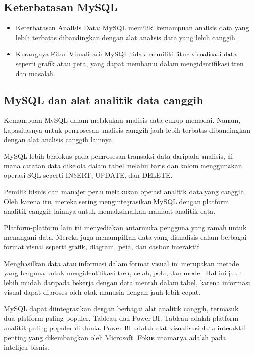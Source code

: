 \documentclass{article}
\begin{document}
\subsection{Keterbatasan MySQL}
\begin{itemize}
    \item Keterbatasan Analisis Data: MySQL memiliki kemampuan analisis data yang lebih terbatas dibandingkan dengan alat analisis data yang lebih canggih.
    \item Kurangnya Fitur Visualisasi: MySQL tidak memiliki fitur visualisasi data seperti grafik atau peta, yang dapat membantu dalam mengidentifikasi tren dan masalah.
\end{itemize}

\subsection{MySQL dan alat analitik data canggih}
Kemampuan MySQL dalam melakukan analisis data cukup memadai. Namun, kapasitasnya untuk pemrosesan analisis canggih jauh lebih terbatas dibandingkan dengan alat analisis canggih lainnya.

MySQL lebih berfokus pada pemrosesan transaksi data daripada analisis, di mana catatan data dikelola dalam tabel melalui baris dan kolom menggunakan operasi SQL seperti INSERT, UPDATE, dan DELETE.

Pemilik bisnis dan manajer perlu melakukan operasi analitik data yang canggih. Oleh karena itu, mereka sering mengintegrasikan MySQL dengan platform analitik canggih lainnya untuk memaksimalkan manfaat analitik data.

Platform-platform lain ini menyediakan antarmuka pengguna yang ramah untuk menangani data. Mereka juga menampilkan data yang dianalisis dalam berbagai format visual seperti grafik, diagram, peta, dan dasbor interaktif.

Menghasilkan data atau informasi dalam format visual ini merupakan metode yang berguna untuk mengidentifikasi tren, celah, pola, dan model. Hal ini jauh lebih mudah daripada bekerja dengan data mentah dalam tabel, karena informasi visual dapat diproses oleh otak manusia dengan jauh lebih cepat.

MySQL dapat diintegrasikan dengan berbagai alat analitik canggih, termasuk dua platform paling populer, Tableau dan Power BI. Tableau adalah platform analitik paling populer di dunia. Power BI adalah alat visualisasi data interaktif penting yang dikembangkan oleh Microsoft. Fokus utamanya adalah pada intelijen bisnis.
\end{document}
